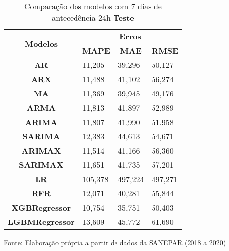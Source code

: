 \begin{table}[H]
	\centering
	\caption{Comparação dos modelos com 7 dias de antecedência 24h \textbf{Teste} }\label{tb:10-24tst}
	\begin{tabular}{@{}clll@{}}
		\toprule
		\multirow{2}{*}{\textbf{Modelos}} & \multicolumn{3}{c}{\textbf{Erros}}                                                                       \\ \cmidrule(l){2-4} 
		& \multicolumn{1}{c}{\textbf{MAPE}} & \multicolumn{1}{c}{\textbf{MAE}} & \multicolumn{1}{c}{\textbf{RMSE}} \\ \hline
\textbf{AR}                       & 11,205                            & 39,296                           & 50,127                            \\
\textbf{ARX}                      & 11,488                            & 41,102                           & 56,274                            \\
\textbf{MA}                       & 11,369                            & 39,945                           & 49,176                            \\
\textbf{ARMA}                     & 11,813                            & 41,897                           & 52,989                            \\
\textbf{ARIMA}                    & 11,807                            & 41,990                           & 51,958                            \\
\textbf{SARIMA}                   & 12,383                            & 44,613                           & 54,671                            \\
\textbf{ARIMAX}                   & 11,514                            & 41,166                           & 56,360                            \\
\textbf{SARIMAX}                  & 11,651                            & 41,735                           & 57,201                            \\
\textbf{LR}        & 105,378                           & 497,224                          & 497,271                           \\
\textbf{RFR}  & 12,071                            & 40,281                           & 55,844                            \\
\textbf{XGBRegressor}             & 10,754                            & 35,751                           & 50,403                            \\
\textbf{LGBMRegressor}            & 13,609                            & 45,772                           & 61,690                            \\ \bottomrule
	\end{tabular}

Fonte: Elaboração própria a partir de dados da SANEPAR (2018 a 2020)
\end{table}

